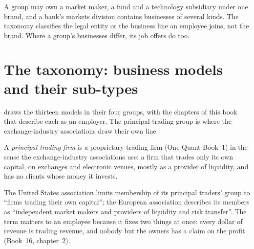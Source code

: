 \begin{remark}\label{rem:in:a-map-of-the-industry:groups}
A group may own a market maker, a fund and a technology subsidiary under one brand, and a bank's markets division
contains businesses of several kinds. The taxonomy classifies the legal entity or the business line an employee joins,
not the brand. Where a group's businesses differ, its job offers do too.
\end{remark}

\section{The taxonomy: business models and their sub-types}

 draws the thirteen models in their four groups, with the chapters of this book
that describe each as an employer. The principal-trading group is where the exchange-industry associations draw their
own line.

\begin{definition}\label{def:in:a-map-of-the-industry:ptf}
A \emph{principal trading firm} is a proprietary trading firm (One Quant Book~1) in the sense
the exchange-industry associations use: a firm that trades only its own capital, on exchanges and electronic venues,
mostly as a provider of liquidity, and has no clients whose money it invests.
\end{definition}

The United States association limits membership of its principal traders' group to ``firms trading their own
capital''; the European association describes its members as ``independent market makers and providers of liquidity
and risk transfer''. The term matters to an employee because it fixes two things at once: every dollar of revenue is
trading revenue, and nobody but the owners has a claim on the profit (Book~16, chapter~2).


